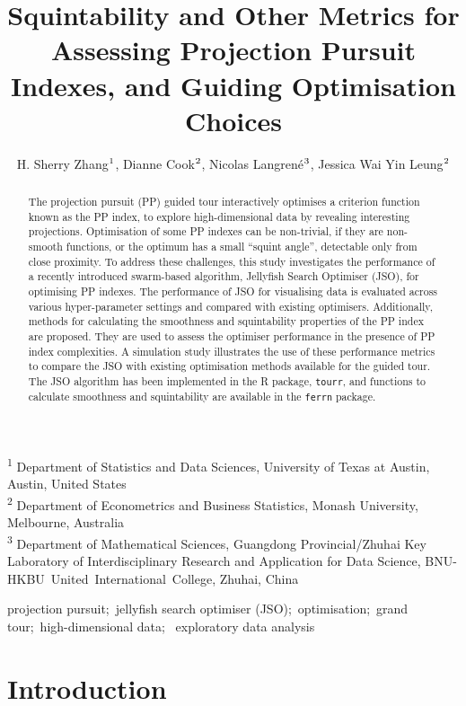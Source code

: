 \documentclass[
  12pt,
]{interact}
\title{Squintability and Other Metrics for Assessing Projection Pursuit
Indexes, and Guiding Optimisation Choices}
\author{H. Sherry Zhang$\textsuperscript{1}$, Dianne
Cook$\textsuperscript{2}$, Nicolas
Langrené$\textsuperscript{3}$, Jessica Wai Yin
Leung$\textsuperscript{2}$}
\theoremstyle{plain}
\begin{document}
\captionsetup{labelsep=space}
\maketitle
\textsuperscript{1} Department of Statistics and Data
Sciences, University of Texas at Austin, Austin, United
States\\ \textsuperscript{2} Department of Econometrics and Business
Statistics, Monash
University, Melbourne, Australia\\ \textsuperscript{3} Department of
Mathematical Sciences, Guangdong Provincial/Zhuhai Key Laboratory of
Interdisciplinary Research and Application for Data Science,
BNU-HKBU~United~International~College, Zhuhai, China
\begin{abstract}
The projection pursuit (PP) guided tour interactively optimises a
criterion function known as the PP index, to explore high-dimensional
data by revealing interesting projections. Optimisation of some PP
indexes can be non-trivial, if they are non-smooth functions, or the
optimum has a small ``squint angle'', detectable only from close
proximity. To address these challenges, this study investigates the
performance of a recently introduced swarm-based algorithm, Jellyfish
Search Optimiser (JSO), for optimising PP indexes. The performance of
JSO for visualising data is evaluated across various hyper-parameter
settings and compared with existing optimisers. Additionally, methods
for calculating the smoothness and squintability properties of the PP
index are proposed. They are used to assess the optimiser performance in
the presence of PP index complexities. A simulation study illustrates
the use of these performance metrics to compare the JSO with existing
optimisation methods available for the guided tour. The JSO algorithm
has been implemented in the R package, \texttt{tourr}, and functions to
calculate smoothness and squintability are available in the
\texttt{ferrn} package.
\end{abstract}
\begin{keywords}
\def\sep{;\ }
projection pursuit\sep jellyfish search optimiser
(JSO)\sep optimisation\sep grand tour\sep high-dimensional data\sep 
exploratory data analysis
\end{keywords}


\section{Introduction}\label{introduction}
\end{document}
